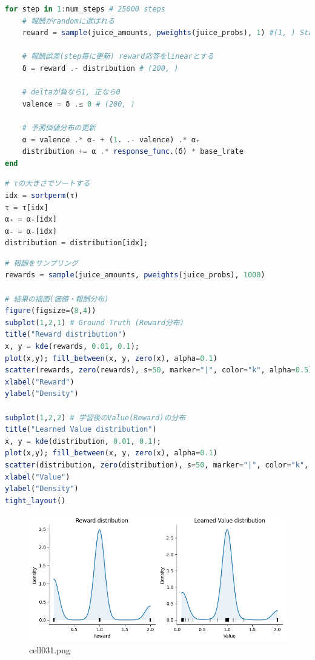 \begin{lstlisting}[language=julia]
for step in 1:num_steps # 25000 steps
    # 報酬がrandomに選ばれる
    reward = sample(juice_amounts, pweights(juice_probs), 1) #(1, ) StatsBase.jl参照
     
    # 報酬誤差(step毎に更新) reward応答をlinearとする
    δ = reward .- distribution # (200, )
 
    # deltaが負なら1, 正なら0
    valence = δ .≤ 0 # (200, )
 
    # 予測価値分布の更新
    α = valence .* α₋ + (1. .- valence) .* α₊
    distribution += α .* response_func.(δ) * base_lrate
end
\end{lstlisting}
\begin{lstlisting}[language=julia]
# τの大きさでソートする
idx = sortperm(τ)
τ = τ[idx]
α₊ = α₊[idx]
α₋ = α₋[idx]
distribution = distribution[idx];
\end{lstlisting}
\begin{lstlisting}[language=julia]
# 報酬をサンプリング
rewards = sample(juice_amounts, pweights(juice_probs), 1000)
 
# 結果の描画(価値・報酬分布)
figure(figsize=(8,4))
subplot(1,2,1) # Ground Truth (Reward分布)
title("Reward distribution")
x, y = kde(rewards, 0.01, 0.1);
plot(x,y); fill_between(x, y, zero(x), alpha=0.1)
scatter(rewards, zero(rewards), s=50, marker="|", color="k", alpha=0.5)
xlabel("Reward")
ylabel("Density")
 
subplot(1,2,2) # 学習後のValue(Reward)の分布
title("Learned Value distribution")
x, y = kde(distribution, 0.01, 0.1);
plot(x,y); fill_between(x, y, zero(x), alpha=0.1)
scatter(distribution, zero(distribution), s=50, marker="|", color="k", alpha=0.5) # rugplot
xlabel("Value")
ylabel("Density")
tight_layout()
\end{lstlisting}
\begin{figure}[ht]
	\centering
	\includegraphics[scale=0.8, max width=\linewidth]{./fig/bayesian-brain/quantile-expectile-regression/cell031.png}
	\caption{cell031.png}
	\label{cell031.png}
\end{figure}
